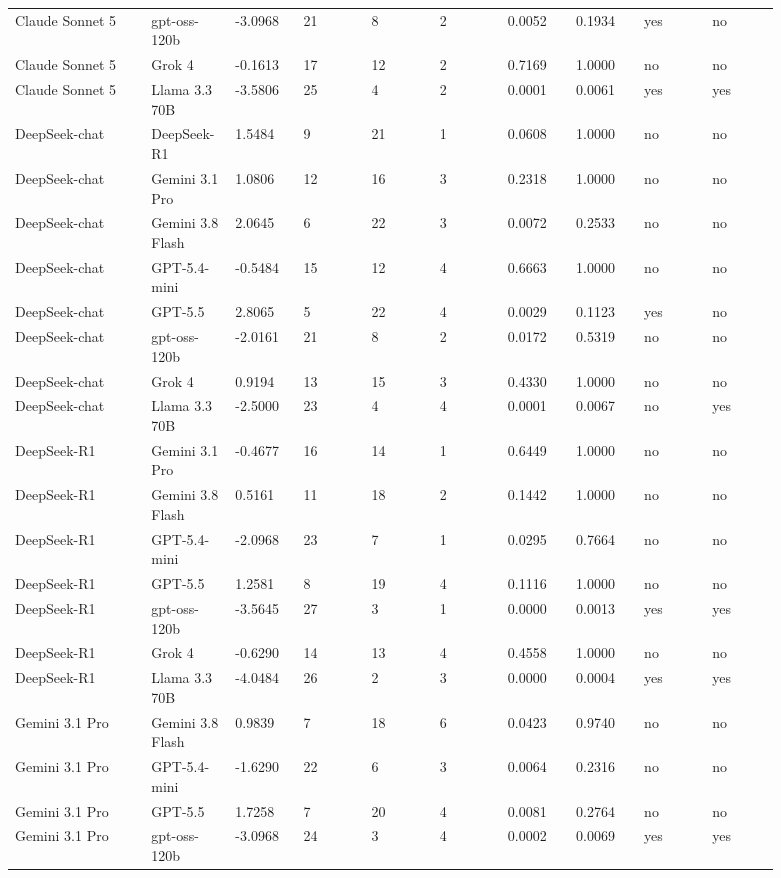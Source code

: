 \begin{landscape}
\begin{longtable}{p{0.162\linewidth}p{0.081\linewidth}p{0.081\linewidth}p{0.081\linewidth}p{0.081\linewidth}p{0.081\linewidth}p{0.081\linewidth}p{0.081\linewidth}p{0.081\linewidth}p{0.081\linewidth}}
Claude Sonnet 5 & gpt-oss-120b & -3.0968 & 21 & 8 & 2 & 0.0052 & 0.1934 & yes & no \\
Claude Sonnet 5 & Grok 4 & -0.1613 & 17 & 12 & 2 & 0.7169 & 1.0000 & no & no \\
Claude Sonnet 5 & Llama 3.3 70B & -3.5806 & 25 & 4 & 2 & 0.0001 & 0.0061 & yes & yes \\
DeepSeek-chat & DeepSeek-R1 & 1.5484 & 9 & 21 & 1 & 0.0608 & 1.0000 & no & no \\
DeepSeek-chat & Gemini 3.1 Pro & 1.0806 & 12 & 16 & 3 & 0.2318 & 1.0000 & no & no \\
DeepSeek-chat & Gemini 3.8 Flash & 2.0645 & 6 & 22 & 3 & 0.0072 & 0.2533 & no & no \\
DeepSeek-chat & GPT-5.4-mini & -0.5484 & 15 & 12 & 4 & 0.6663 & 1.0000 & no & no \\
DeepSeek-chat & GPT-5.5 & 2.8065 & 5 & 22 & 4 & 0.0029 & 0.1123 & yes & no \\
DeepSeek-chat & gpt-oss-120b & -2.0161 & 21 & 8 & 2 & 0.0172 & 0.5319 & no & no \\
DeepSeek-chat & Grok 4 & 0.9194 & 13 & 15 & 3 & 0.4330 & 1.0000 & no & no \\
DeepSeek-chat & Llama 3.3 70B & -2.5000 & 23 & 4 & 4 & 0.0001 & 0.0067 & no & yes \\
DeepSeek-R1 & Gemini 3.1 Pro & -0.4677 & 16 & 14 & 1 & 0.6449 & 1.0000 & no & no \\
DeepSeek-R1 & Gemini 3.8 Flash & 0.5161 & 11 & 18 & 2 & 0.1442 & 1.0000 & no & no \\
DeepSeek-R1 & GPT-5.4-mini & -2.0968 & 23 & 7 & 1 & 0.0295 & 0.7664 & no & no \\
DeepSeek-R1 & GPT-5.5 & 1.2581 & 8 & 19 & 4 & 0.1116 & 1.0000 & no & no \\
DeepSeek-R1 & gpt-oss-120b & -3.5645 & 27 & 3 & 1 & 0.0000 & 0.0013 & yes & yes \\
DeepSeek-R1 & Grok 4 & -0.6290 & 14 & 13 & 4 & 0.4558 & 1.0000 & no & no \\
DeepSeek-R1 & Llama 3.3 70B & -4.0484 & 26 & 2 & 3 & 0.0000 & 0.0004 & yes & yes \\
Gemini 3.1 Pro & Gemini 3.8 Flash & 0.9839 & 7 & 18 & 6 & 0.0423 & 0.9740 & no & no \\
Gemini 3.1 Pro & GPT-5.4-mini & -1.6290 & 22 & 6 & 3 & 0.0064 & 0.2316 & no & no \\
Gemini 3.1 Pro & GPT-5.5 & 1.7258 & 7 & 20 & 4 & 0.0081 & 0.2764 & no & no \\
Gemini 3.1 Pro & gpt-oss-120b & -3.0968 & 24 & 3 & 4 & 0.0002 & 0.0069 & yes & yes \\

\end{longtable}
\end{landscape}
